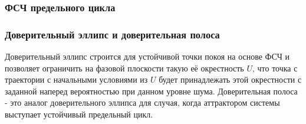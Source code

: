 \documentclass[slidestop,compress,mathserif]{beamer}
\begin{document}
\begin{frame}
\frametitle{ФСЧ предельного цикла}
\begin{figure}[h!]
\vspace{-1em}
\vspace{-2em}
\end{figure}
\end{frame}
\begin{frame}
\frametitle{Доверительный эллипс и доверительная полоса}
\vspace{1em}
Доверительный эллипс строится для устойчивой точки покоя на основе ФСЧ и позволяет ограничить на фазовой плоскости такую её окрестность $U$, что точка с траектории с начальными условиями из $U$ будет принадлежать этой окрестности с заданной наперед вероятностью при данном уровне шума. Доверительная полоса - это аналог доверительного эллипса для случая, когда аттрактором системы выступает устойчивый предельный цикл.
\end{frame}
\end{document}
